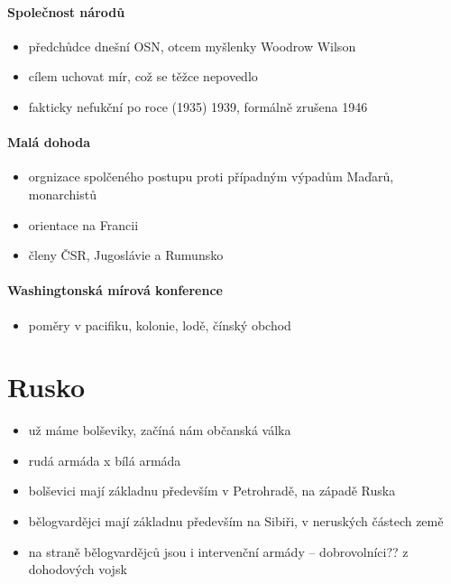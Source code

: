 \documentclass{article}
\begin{document}
\subsection{Společnost národů}
\begin{itemize}
  \item předchůdce dnešní OSN, otcem myšlenky Woodrow Wilson
  \item cílem uchovat mír, což se těžce nepovedlo
  \item fakticky nefukční po roce (1935) 1939, formálně zrušena 1946
\end{itemize}

\subsection{Malá dohoda}
\begin{itemize}
  \item orgnizace spolčeného postupu proti případným výpadům Maďarů, monarchistů
  \item orientace na Francii
  \item členy ČSR, Jugoslávie a Rumunsko
\end{itemize}

\subsection{Washingtonská mírová konference}
\begin{itemize}
  \item poměry v pacifiku, kolonie, lodě, čínský obchod
\end{itemize}

\part{Rusko}
\begin{itemize}
  \item už máme bolševiky, začíná nám občanská válka
  \item rudá armáda x bílá armáda
  \item bolševici mají základnu především v Petrohradě, na západě Ruska
  \item bělogvardějci mají základnu především na Sibiři, v neruských částech země
  \item na straně bělogvardějců jsou i intervenční armády -- dobrovolníci?? z dohodových vojsk
\end{itemize}
\end{document}
